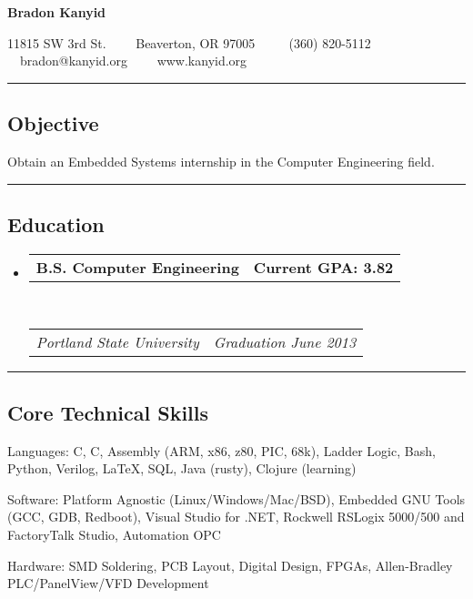 \documentclass[10pt,letterpaper]{article}
\makeatletter
\newenvironment{indentsection}[1]%
{\begin{list}{}%
	{\setlength{\leftmargin}{#1}}%
	\item[]%
}
{\end{list}}
\newcommand{\headerrow}[2]
{\begin{tabular*}{\linewidth}{l@{\extracolsep{\fill}}r}
	#1 &
	#2 \\
\end{tabular*}}
\newcommand{\CPP}
{C\nolinebreak[4]\hspace{-.05em}\raisebox{.22ex}{\footnotesize\bf ++}}
\makeatother
\begin{document}
\begin{center}
{\LARGE \textbf{Bradon Kanyid}}

11815 SW 3rd St.\ \ \textbullet
\ \ Beaverton, OR 97005 \ \ \textbullet
\ \ (360) 820-5112\\
\ \ bradon@kanyid.org\ \ \textbullet
\ \ www.kanyid.org\ \ \textbullet
\end{center}

\hrule
\vspace{-0.4em}
\subsection*{Objective}
\begin{indentsection}{\parindent}
\begin{description*}
	\item Obtain an Embedded Systems internship in the Computer Engineering field.
\end{description*}
\end{indentsection}

\hrule
\vspace{-0.4em}
\subsection*{Education}

\begin{itemize}
	\parskip=0.1em

	\item 
	\headerrow
                {\textbf{B.S. Computer Engineering}}
		{\textbf{Current GPA: 3.82}}
	\\
	\headerrow
		{\emph{Portland State University}}
		{\emph{Graduation June 2013}}
\end{itemize}

\hrule
\vspace{-0.4em}
\subsection*{Core Technical Skills}

\begin{indentsection}{\parindent}
\begin{description*}
	\item[Languages:]
    C, \CPP, Assembly (ARM, x86, z80, PIC, 68k), Ladder Logic, Bash, Python, Verilog, \LaTeX, SQL, Java (rusty), Clojure (learning)
	\item[Software:]
    Platform Agnostic (Linux/Windows/Mac/BSD), Embedded GNU Tools (GCC, GDB, Redboot), Visual Studio for .NET, Rockwell RSLogix 5000/500 and FactoryTalk Studio, Automation OPC 
	\item[Hardware:]
    SMD Soldering, PCB Layout, Digital Design, FPGAs, Allen-Bradley PLC/PanelView/VFD Development 
\end{description*}
\end{indentsection}
\end{document}
